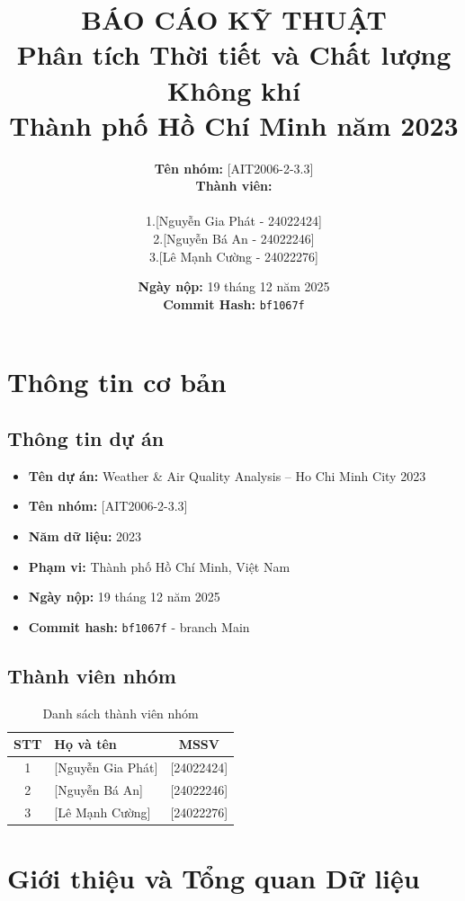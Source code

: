 \documentclass[12pt,a4paper]{article}
\title{\textbf{BÁO CÁO KỸ THUẬT}\\
\Large Phân tích Thời tiết và Chất lượng Không khí\\
Thành phố Hồ Chí Minh năm 2023}
\author{
    \textbf{Tên nhóm:} [AIT2006-2-3.3]\\
    \textbf{Thành viên:}\\
    \begin{tabular}{ll}
        1. & [Nguyễn Gia Phát - 24022424]\\
        2. & [Nguyễn Bá An    - 24022246]\\
        3. & [Lê Mạnh Cường   - 24022276]\\
    \end{tabular}
}
\date{\textbf{Ngày nộp:} 19 tháng 12 năm 2025\\
\textbf{Commit Hash:} \texttt{bf1067f}}
\begin{document}
\maketitle
\thispagestyle{empty}

\newpage
\tableofcontents
\newpage

\section{Thông tin cơ bản}

\subsection{Thông tin dự án}
\begin{itemize}[leftmargin=*]
    \item \textbf{Tên dự án:} Weather \& Air Quality Analysis – Ho Chi Minh City 2023
    \item \textbf{Tên nhóm:} [AIT2006-2-3.3]
    \item \textbf{Năm dữ liệu:} 2023
    \item \textbf{Phạm vi:} Thành phố Hồ Chí Minh, Việt Nam
    \item \textbf{Ngày nộp:} 19 tháng 12 năm 2025
    \item \textbf{Commit hash:} \texttt{bf1067f} - branch Main
\end{itemize}

\subsection{Thành viên nhóm}
\begin{table}[H]
\centering
\begin{tabular}{clc}
\toprule
\textbf{STT} & \textbf{Họ và tên} & \textbf{MSSV} \\
\midrule
1 & [Nguyễn Gia Phát] & [24022424] \\
2 & [Nguyễn Bá An] & [24022246] \\
3 & [Lê Mạnh Cường] & [24022276] \\
\bottomrule
\end{tabular}
\caption{Danh sách thành viên nhóm}
\end{table}

\section{Giới thiệu và Tổng quan Dữ liệu}
\end{document}
